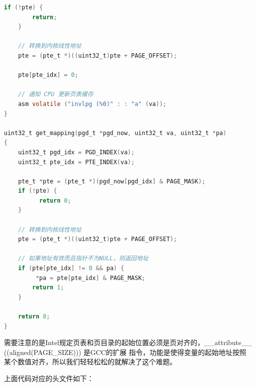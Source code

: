 \begin{lstlisting}[language = C, caption = mm/vmm.c]
	if (!pte) {
		return;
	}

	// 转换到内核线性地址
	pte = (pte_t *)((uint32_t)pte + PAGE_OFFSET);

	pte[pte_idx] = 0;

	// 通知 CPU 更新页表缓存
	asm volatile ("invlpg (%0)" : : "a" (va));
}

uint32_t get_mapping(pgd_t *pgd_now, uint32_t va, uint32_t *pa)
{
	uint32_t pgd_idx = PGD_INDEX(va);
	uint32_t pte_idx = PTE_INDEX(va);

	pte_t *pte = (pte_t *)(pgd_now[pgd_idx] & PAGE_MASK);
	if (!pte) {
	      return 0;
	}
	
	// 转换到内核线性地址
	pte = (pte_t *)((uint32_t)pte + PAGE_OFFSET);

	// 如果地址有效而且指针不为NULL，则返回地址
	if (pte[pte_idx] != 0 && pa) {
		 *pa = pte[pte_idx] & PAGE_MASK;
		return 1;
	}

	return 0;
}
\end{lstlisting}

\par 需要注意的是Intel规定页表和页目录的起始位置必须是页对齐的，\_\_attribute\_\_ ((aligned(PAGE\_SIZE))) 是GCC的扩展\allowbreak
指令，功能是使得变量的起始地址按照某个数值对齐，所以我们轻轻松松的就解决了这个难题。

\par 上面代码对应的头文件如下：

